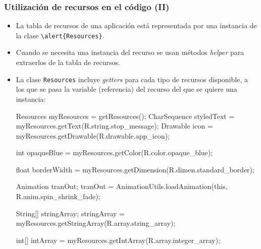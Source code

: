 \documentclass[hyperref={pdfpagelabels=true},ucs]{beamer}
\begin{document}
\begin{frame}[fragile]
\frametitle{Utilización de recursos en el código (II)}

\begin{itemize}
\item La tabla de recursos de una aplicación está representada por una
  instancia de la clase \Verb|\alert{Resources}|.
\item Cuando se necesita una instancia del recurso se usan métodos
  \emph{helper} para extraerlos de la tabla de recursos.
\item La clase \verb|Resources| incluye \emph{getters} para cada tipo
  de recursos disponible, a los que se pasa la variable (referencia)
  del recurso del que se quiere una instancia:
\begin{tiny}
\begin{block}{}
\begin{java}
Resources myResources = getResources();
CharSequence styledText = myResources.getText(R.string.stop_message);
Drawable icon = myResources.getDrawable(R.drawable.app_icon);

int opaqueBlue = myResources.getColor(R.color.opaque_blue);

float borderWidth = myResources.getDimension(R.dimen.standard_border);

Animation tranOut;
tranOut = AnimationUtils.loadAnimation(this, R.anim.spin_shrink_fade);

String[] stringArray;
stringArray = myResources.getStringArray(R.array.string_array);

int[] intArray = myResources.getIntArray(R.array.integer_array);
\end{java}
\end{block}
\end{tiny}



\end{itemize}

\end{frame}
\end{document}
